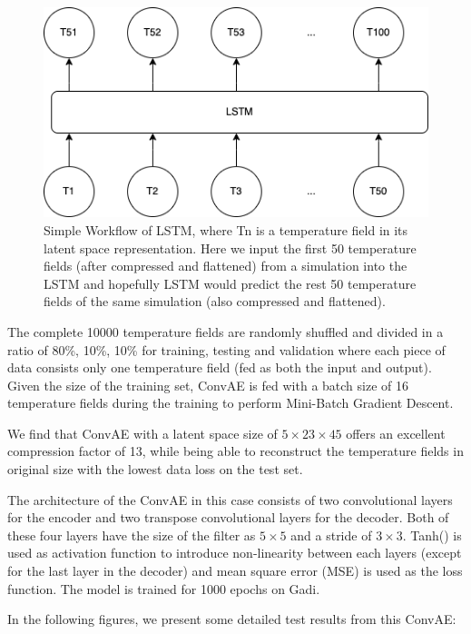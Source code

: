 \begin{figure}[H]
    \centering
    \caption{Simple Workflow of LSTM, where Tn is a temperature field in its latent space representation. Here we input the first 50 temperature fields (after compressed and flattened) from a simulation into the LSTM and hopefully LSTM would predict the rest 50 temperature fields of the same simulation (also compressed and flattened).}
    \includegraphics[scale=0.6]{figures/mantle_convection_images/LSTM_workflow.png}
\end{figure}

The complete 10000 temperature fields are randomly shuffled and divided in a ratio of 80\%, 10\%, 10\% for training, testing and validation where each piece of data consists only one temperature field (fed as both the input and output). Given the size of the training set, ConvAE is fed with a batch size of 16 temperature fields during the training to perform Mini-Batch Gradient Descent.

We find that ConvAE with a latent space size of $5 \times 23 \times 45$ offers an excellent compression factor of 13, while being able to reconstruct the temperature fields in original size with the lowest data loss on the test set.

The architecture of the ConvAE in this case consists of two convolutional layers for the encoder and two transpose convolutional layers for the decoder. Both of these four layers have the size of the filter as $5 \times 5$ and a stride of $3 \times 3$. Tanh() is used as activation function to introduce non-linearity between each layers (except for the last layer in the decoder) and mean square error (MSE) is used as the loss function. The model is trained for 1000 epochs on Gadi.

In the following figures, we present some detailed test results from this ConvAE:

